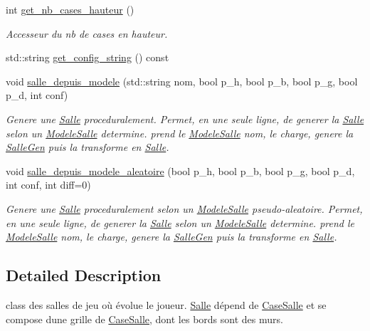 \begin{DoxyCompactItemize}
int \hyperlink{classSalle_a80ca41c533d0ec567b1d4e78779225ba}{get\+\_\+nb\+\_\+cases\+\_\+hauteur} ()
\begin{DoxyCompactList}\small\item\em Accesseur du nb de cases en hauteur. \end{DoxyCompactList}\item 
std\+::string \hyperlink{classSalle_ac8e706275a4d3545eb33a6f446a554a1}{get\+\_\+config\+\_\+string} () const 
\item 
void \hyperlink{classSalle_a6eaf8452709243464f7919b53bccc0b3}{salle\+\_\+depuis\+\_\+modele} (std\+::string nom, bool p\+\_\+h, bool p\+\_\+b, bool p\+\_\+g, bool p\+\_\+d, int conf)
\begin{DoxyCompactList}\small\item\em Genere une \hyperlink{classSalle}{Salle} proceduralement. Permet, en une seule ligne, de generer la \hyperlink{classSalle}{Salle} selon un \hyperlink{classModeleSalle}{Modele\+Salle} determine. prend le \hyperlink{classModeleSalle}{Modele\+Salle} \textquotesingle{}nom\textquotesingle{}, le charge, genere la \hyperlink{classSalleGen}{Salle\+Gen} puis la transforme en \hyperlink{classSalle}{Salle}. \end{DoxyCompactList}\item 
void \hyperlink{classSalle_aee514de189a50abde0370f8a7848fb4e}{salle\+\_\+depuis\+\_\+modele\+\_\+aleatoire} (bool p\+\_\+h, bool p\+\_\+b, bool p\+\_\+g, bool p\+\_\+d, int conf, int diff=0)
\begin{DoxyCompactList}\small\item\em Genere une \hyperlink{classSalle}{Salle} proceduralement selon un \hyperlink{classModeleSalle}{Modele\+Salle} pseudo-\/aleatoire. Permet, en une seule ligne, de generer la \hyperlink{classSalle}{Salle} selon un \hyperlink{classModeleSalle}{Modele\+Salle} determine. prend le \hyperlink{classModeleSalle}{Modele\+Salle} \textquotesingle{}nom\textquotesingle{}, le charge, genere la \hyperlink{classSalleGen}{Salle\+Gen} puis la transforme en \hyperlink{classSalle}{Salle}. \end{DoxyCompactList}\end{DoxyCompactItemize}


\subsection{Detailed Description}
class des salles de jeu où évolue le joueur. \hyperlink{classSalle}{Salle} dépend de \hyperlink{classCaseSalle}{Case\+Salle} et se compose d\textquotesingle{}une grille de \hyperlink{classCaseSalle}{Case\+Salle}, dont les bords sont des murs. 

